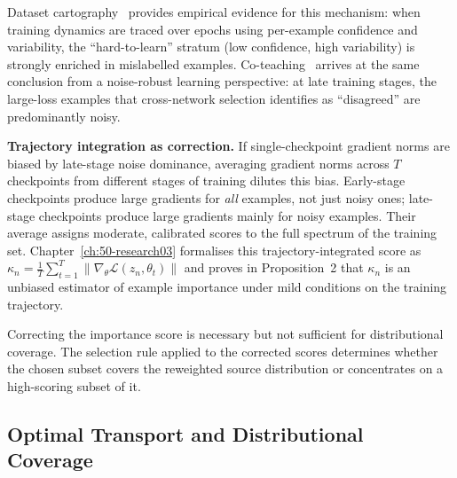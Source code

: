 \begin{foldable}
  Dataset cartography~\cite{swayamdipta2020dataset} provides empirical evidence for this mechanism: when training dynamics are traced over epochs using per-example confidence and variability, the ``hard-to-learn'' stratum (low confidence, high variability) is strongly enriched in mislabelled examples.
  Co-teaching~\cite{han2018co} arrives at the same conclusion from a noise-robust learning perspective: at late training stages, the large-loss examples that cross-network selection identifies as ``disagreed'' are predominantly noisy.
\end{foldable}

\begin{foldable}
  \textbf{Trajectory integration as correction.}
  If single-checkpoint gradient norms are biased by late-stage noise dominance, averaging gradient norms across $T$ checkpoints from different stages of training dilutes this bias.
  Early-stage checkpoints produce large gradients for \emph{all} examples, not just noisy ones; late-stage checkpoints produce large gradients mainly for noisy examples.
  Their average assigns moderate, calibrated scores to the full spectrum of the training set.
  Chapter~\ref{ch:50-research03} formalises this trajectory-integrated score as $\kappa_n = \frac{1}{T}\sum_{t=1}^{T} \|\nabla_\theta \mathcal{L}(z_n, \theta_t)\|$ and proves in Proposition~2 that $\kappa_n$ is an unbiased estimator of example importance under mild conditions on the training trajectory.
\end{foldable}

\begin{foldable}
  Correcting the importance score is necessary but not sufficient for distributional coverage.
  The selection rule applied to the corrected scores determines whether the chosen subset covers the reweighted source distribution or concentrates on a high-scoring subset of it.
\end{foldable}

\subsection{Optimal Transport and Distributional Coverage}
\label{sec:27-background-importanceselection-ot}

